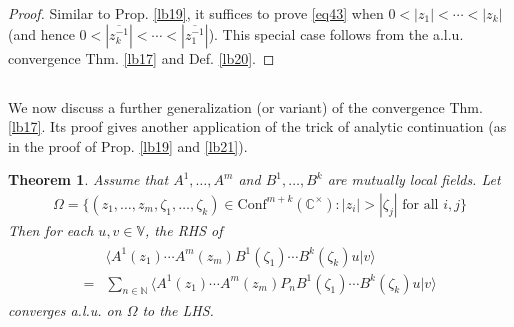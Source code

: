 \documentclass[12pt,b5paper,notitlepage]{article}
\theoremstyle{definition}
\theoremstyle{plain}
\newtheorem{thm}[df]{Theorem}
\newcommand{\ovl}{\overline}
\newcommand{\Conf}{\mathrm{Conf}}
\newcommand{\bk}[1]{\langle {#1}\rangle}
\newcommand{\Vbb}{\mathbb V}
\newcommand{\Cbb}{\mathbb C}
\newcommand{\Nbb}{\mathbb N}
\numberwithin{equation}{section}
\begin{document}
\begin{proof}
Similar to Prop. \ref{lb19}, it suffices to prove \eqref{eq43} when $0<|z_1|<\cdots<|z_k|$ (and hence $0<|\ovl{z_k^{-1}}|<\cdots<|\ovl{z_1^{-1}}|$). This special case follows from the a.l.u. convergence Thm. \ref{lb17} and Def. \ref{lb20}.
\end{proof}









\subsection{}


We now discuss a further generalization (or variant) of the convergence Thm. \ref{lb17}. Its proof gives another application of the trick of analytic continuation (as in the proof of Prop. \ref{lb19} and \ref{lb21}).

\begin{thm}\label{lb22}
Assume that $A^1,\dots,A^m$ and $B^1,\dots,B^k$ are mutually local fields. Let
\begin{align*}
\Omega=\{(z_1,\dots,z_m,\zeta_1,\dots,\zeta_k)\in\Conf^{m+k}(\Cbb^{\times}):|z_i|>|\zeta_j|\text{ for all }i,j\}
\end{align*}
Then for each $u,v\in\Vbb$, the RHS of 
\begin{align}
\begin{aligned}
&\bk{A^1(z_1)\cdots A^m(z_m)B^1(\zeta_1)\cdots B^k(\zeta_k)u|v}\\
=&\sum_{n\in\Nbb}\bk{A^1(z_1)\cdots A^m(z_m)P_nB^1(\zeta_1)\cdots B^k(\zeta_k)u|v}
\end{aligned}
\end{align}
converges a.l.u. on $\Omega$ to the LHS.
\end{thm}
\end{document}
